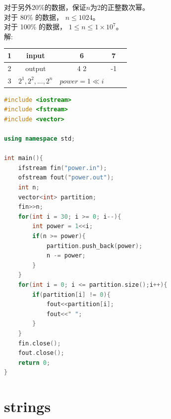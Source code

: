 \documentclass[12pt,twiside,a4paper]{ctexbook}
\numberwithin{chapter}{part}
\begin{document}
对于另外20\%的数据，保证$n$为2的正整数次幂。\\
对于 80\% 的数据， $n\leq 1024$。\\
对于 100\% 的数据， $1\leq n\leq 1\times10^7$。\\
解:\\
\begin{tabular}{|c|c|c|c|c|}
\hline
1 & input &6 & 7\\
\hline
2 & output & 4 2 & -1\\
\hline
3 & $2^1,2^2,...,2^n$ & $power = 1\ll i$& \\
\hline
\end{tabular}
\begin{lstlisting}[language=C++,breaklines=true]
#include <iostream>
#include <fstream>
#include <vector>

using namespace std;

int main(){
	ifstream fin("power.in");
	ofstream fout("power.out");
	int n;
	vector<int> partition;
	fin>>n;
	for(int i = 30; i >= 0; i--){
		int power = 1<<i;
		if(n >= power){
			partition.push_back(power);
			n -= power;
		}
	}
	for(int i = 0; i <= partition.size();i++){
		if(partition[i] != 0){
			fout<<partition[i];
			fout<<" ";
		}
	}
	fin.close();
	fout.close();
	return 0;
}
\end{lstlisting}


\chapter{strings}
\end{document}
